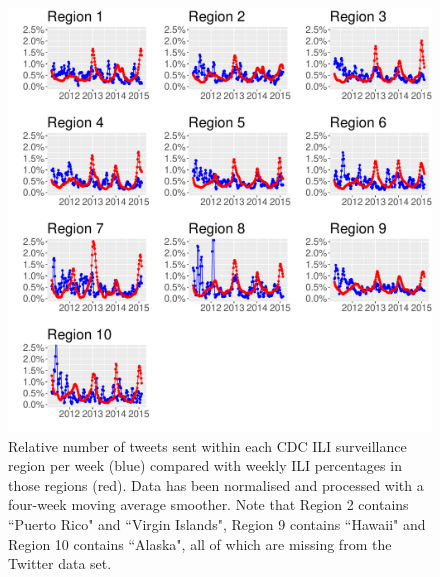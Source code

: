 \documentclass[11pt, a4paper]{report}\usepackage[]{graphicx}\usepackage[]{color}
\begin{document}
\begin{figure}[H]
\centering
\includegraphics[width=1\linewidth]{cdc_twitter_comp_regs_ma4.pdf}
\caption{Relative number of tweets sent within each CDC ILI surveillance region per week (blue) compared with weekly ILI percentages in those regions (red). Data has been normalised and processed with a four-week moving average smoother. Note that Region 2 contains ``Puerto Rico" and ``Virgin Islands", Region 9 contains ``Hawaii" and Region 10 contains ``Alaska", all of which are missing from the Twitter data set.}
\label{fig:cdc_tw_comp_regs_ma4}
\end{figure}
\end{document}
